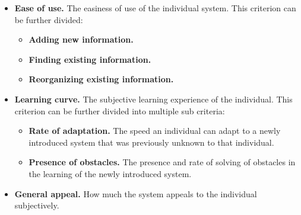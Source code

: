 \begin{itemize}
\item \textbf{Ease of use.} The easiness of use of the individual system. This criterion can be further divided:
\begin{itemize}
\item \textbf{Adding new information.}
\item \textbf{Finding existing information.}
\item \textbf{Reorganizing existing information.}
\end{itemize}
\item \textbf{Learning curve.} The subjective learning experience of the individual. This criterion can be further divided into multiple sub criteria:
\begin{itemize}
\item \textbf{Rate of adaptation.} The speed an individual can adapt to a newly introduced system that was previously unknown to that individual.
\item \textbf{Presence of obstacles.} The presence and rate of solving of obstacles in the learning of the newly introduced system.
\end{itemize}
\item \textbf{General appeal.} How much the system appeals to the individual subjectively.
\end{itemize}
